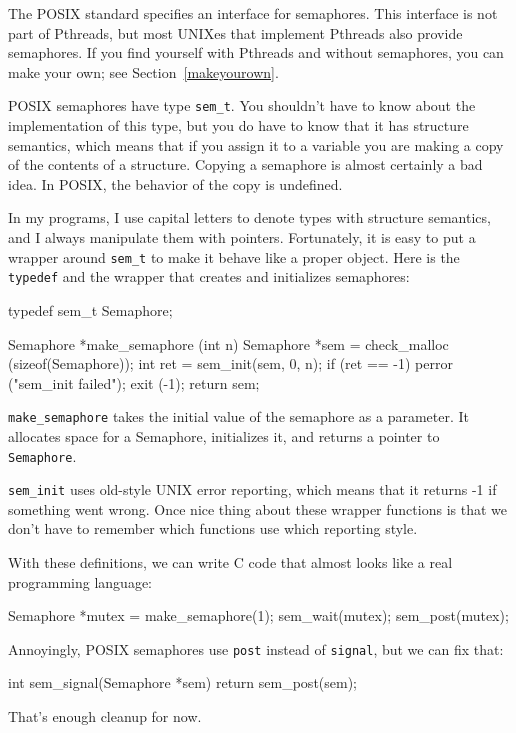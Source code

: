The POSIX standard specifies an interface for semaphores.
This interface is not part of Pthreads, but most UNIXes
that implement Pthreads also provide semaphores.  If you
find yourself with Pthreads and without semaphores, you
can make your own; see Section~\ref{makeyourown}.

POSIX semaphores have type {\tt sem\_t}.  You shouldn't have
to know about the implementation of this type, but you do
have to know that it has structure semantics, which means that
if you assign it to a variable you are making a copy of the
contents of a structure.  Copying a semaphore is almost certainly
a bad idea.  In POSIX, the behavior of the copy is undefined.

In my programs, I use capital letters to denote types with
structure semantics, and I always manipulate them with pointers.
Fortunately, it is easy to put a wrapper around {\tt sem\_t}
to make it behave like a proper object.  Here is the 
{\tt typedef} and the wrapper that creates and initializes
semaphores:

\begin{lstbox}{}
typedef sem_t Semaphore;

Semaphore *make_semaphore (int n)
{
  Semaphore *sem = check_malloc (sizeof(Semaphore));
  int ret = sem_init(sem, 0, n);
  if (ret == -1) {
    perror ("sem_init failed");
    exit (-1);    
  }
  return sem;
}
\end{lstbox}

{\tt make\_semaphore} takes the initial value of the semaphore
as a parameter.  It allocates space for a Semaphore, initializes
it, and returns a pointer to {\tt Semaphore}.

{\tt sem\_init} uses old-style UNIX error reporting, which means
that it returns -1 if something went wrong.  Once nice thing
about these wrapper functions is that we don't have to remember
which functions use which reporting style.

With these definitions, we can write C code that almost looks
like a real programming language:

\begin{lstbox}{}
Semaphore *mutex = make_semaphore(1);
sem_wait(mutex);
sem_post(mutex);
\end{lstbox}

Annoyingly, POSIX semaphores use {\tt post} instead of
{\tt signal}, but we can fix that:

\begin{lstbox}{}
int sem_signal(Semaphore *sem)
{
  return sem_post(sem);
}
\end{lstbox}

That's enough cleanup for now.


